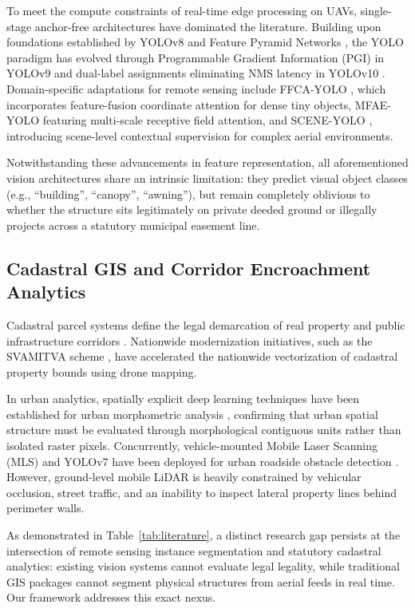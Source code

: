 \documentclass[conference]{IEEEtran}
\begin{document}
To meet the compute constraints of real-time edge processing on UAVs, single-stage anchor-free architectures have dominated the literature. Building upon foundations established by YOLOv8 \cite{jocher2023yolo} and Feature Pyramid Networks \cite{lin2017feature}, the YOLO paradigm has evolved through Programmable Gradient Information (PGI) in YOLOv9 \cite{wang2024yolov9} and dual-label assignments eliminating NMS latency in YOLOv10 \cite{wang2024yolov10}. Domain-specific adaptations for remote sensing include FFCA-YOLO \cite{zhang2024ffca}, which incorporates feature-fusion coordinate attention for dense tiny objects, MFAE-YOLO \cite{liu2025mfae} featuring multi-scale receptive field attention, and SCENE-YOLO \cite{wang2025scene}, introducing scene-level contextual supervision for complex aerial environments. 

Notwithstanding these advancements in feature representation, all aforementioned vision architectures share an intrinsic limitation: they predict visual object classes (e.g., ``building'', ``canopy'', ``awning''), but remain completely oblivious to whether the structure sits legitimately on private deeded ground or illegally projects across a statutory municipal easement line.

\subsection{Cadastral GIS and Corridor Encroachment Analytics}
Cadastral parcel systems define the legal demarcation of real property and public infrastructure corridors \cite{williamson2010land, rao2021high}. Nationwide modernization initiatives, such as the SVAMITVA scheme \cite{svamitva2020}, have accelerated the nationwide vectorization of cadastral property bounds using drone mapping. 

In urban analytics, spatially explicit deep learning techniques have been established for urban morphometric analysis \cite{fleischmann2024spatially}, confirming that urban spatial structure must be evaluated through morphological contiguous units rather than isolated raster pixels. Concurrently, vehicle-mounted Mobile Laser Scanning (MLS) and YOLOv7 have been deployed for urban roadside obstacle detection \cite{verma2024urban}. However, ground-level mobile LiDAR is heavily constrained by vehicular occlusion, street traffic, and an inability to inspect lateral property lines behind perimeter walls.

As demonstrated in Table~\ref{tab:literature}, a distinct research gap persists at the intersection of remote sensing instance segmentation and statutory cadastral analytics: existing vision systems cannot evaluate legal legality, while traditional GIS packages cannot segment physical structures from aerial feeds in real time. Our framework addresses this exact nexus.
\end{document}
